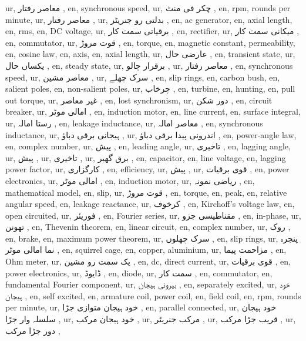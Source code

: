 ur, معاصر رفتار ,
en, synchronous speed,
ur, چکر فی منٹ ,
en, rpm, rounds per minute,
ur, معاصر رفتار ,
ur, بدلتی رو جنریٹر ,
en, ac generator,
en, axial length,
en, rms,
en, DC voltage,
ur, برقیاتی سمت کار ,
en, rectifier,
ur, میکانی سمت کار ,
en, commutator,
ur, قوت مروڑ ,
en, torque,
en, magnetic constant, permeability,
en, cosine law,
en, axis,
en, axial length,
ur, عارضی حال ,
en, transient state,
ur, یکساں حال ,
en, steady state,
ur, برقرار چالو ,
ur, معاصر رفتار ,
en, synchronous speed,
ur, معاصر مشین ,
ur, سرک چھلے ,
en, slip rings,
en, carbon bush,
en, salient poles,
en, non-salient poles,
ur, چرخاب ,
en, turbine,
en, hunting,
en, pull out torque,
ur, غیر معاصر ,
en, lost synchronism,
ur, دور شکن ,
en, circuit breaker,
ur, امالی موٹر ,
en, induction motor,
en, line current,
en, surface integral,
ur, رستا امالہ ,
en, leakage inductance,
ur, معاصر امالہ ,
en, synchronous inductance,
ur, ہیجانی برقی دباؤ ,
ur, اندرونی پیدا برقی دباؤ ,
en, power-angle law,
en, complex number,
ur, پیش ,
en, leading angle,
ur, تاخیری ,
en, lagging angle,
ur, پیش ,
ur, تاخیری ,
ur, برق گھیر ,
en, capacitor,
en, line voltage,
en, lagging power factor,
ur, کارگزاری ,
en, efficiency,
ur, پیش ,
ur, قوی برقیات ,
en, power electronics,
ur, امالی موٹر ,
en, induction motor,
ur, ریاضی نمونہ ,
en, mathematical model,
en, slip,
ur, قوت مروڑ ,
en, torque,
en, peak,
en, relative angular speed,
en, leakage reactance,
ur, کرخوف ,
en, Kirchoff's voltage law,
en, open circuited,
ur, فوریئر ,
en, Fourier series,
ur,  مقناطیسی جزو ,
en, in-phase,
ur, تھونن ,
en, Thevenin theorem,
en, linear circuit,
en, complex number,
ur, روک ,
en, brake,
en, maximum power theorem,
ur, سرک چھلوں ,
en, slip rings,
ur, پنجرہ نما امالی موٹر ,
en, squirrel cage,
en, copper, aluminium,
ur, مزاحمت پیما ,
en, Ohm meter,
ur, یک سمت رو مشین ,
en, dc, direct current,
ur, قوی برقیات ,
en, power electronics,
ur, ڈایوڈ ,
en, diode,
ur, سمت کار ,
en, commutator,
en, fundamental Fourier component,
ur, بیرونی ہیجان ,
en, separately excited,
ur, خود ہیجان ,
en, self excited,
en, armature coil, power coil,
en, field coil,
en, rpm, rounds per minute,
ur, خود ہیجان متوازی جڑا ,
en, parallel connected,
ur, خود ہیجان سلسلہ وار جڑا ,
ur, خود ہیجان مرکب ,
ur, مرکب جنریٹر ,
ur, قریب جڑا مرکب ,
ur, دور جڑا مرکب ,
